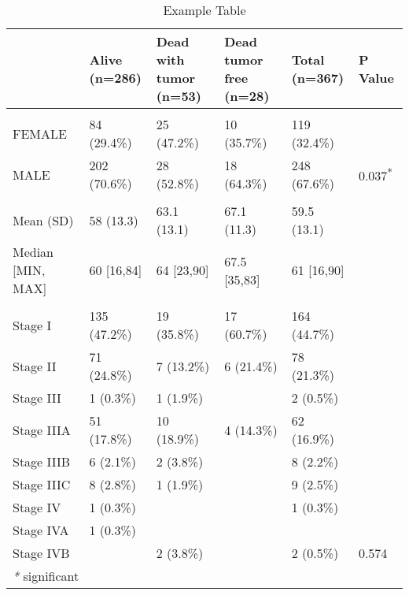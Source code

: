 \documentclass[]{article}
\begin{document}
\newpage

\begin{table}

\caption{\label{tab:unnamed-chunk-2}Example Table}
\centering
\begin{tabular}[t]{llllll}
\toprule
  & \makecell[c]{Alive\\(n=286)} & \makecell[c]{Dead with tumor\\(n=53)} & \makecell[c]{Dead tumor free\\(n=28)} & \makecell[c]{Total\\(n=367)} & P Value\\
\midrule
\addlinespace[0.3em]
\multicolumn{6}{l}{\textbf{Gender}}\\
\hspace{1em}FEMALE & 84 (29.4\%) & 25 (47.2\%) & 10 (35.7\%) & 119 (32.4\%) & \\
\hspace{1em}MALE & 202 (70.6\%) & 28 (52.8\%) & 18 (64.3\%) & 248 (67.6\%) & 0.037\textsuperscript{*}\\
\addlinespace[0.3em]
\multicolumn{6}{l}{\textbf{Age}}\\
\hspace{1em}Mean (SD) & 58 (13.3) & 63.1 (13.1) & 67.1 (11.3) & 59.5 (13.1) & \\
\hspace{1em}Median [MIN, MAX] & 60 [16,84] & 64 [23,90] & 67.5 [35,83] & 61 [16,90] & \\
\addlinespace[0.3em]
\multicolumn{6}{l}{\textbf{Stage}}\\
\hspace{1em}Stage I & 135 (47.2\%) & 19 (35.8\%) & 17 (60.7\%) & 164 (44.7\%) & \\
\hspace{1em}Stage II & 71 (24.8\%) & 7 (13.2\%) & 6 (21.4\%) & 78 (21.3\%) & \\
\hspace{1em}Stage III & 1 (0.3\%) & 1 (1.9\%) &  & 2 (0.5\%) & \\
\hspace{1em}Stage IIIA & 51 (17.8\%) & 10 (18.9\%) & 4 (14.3\%) & 62 (16.9\%) & \\
\hspace{1em}Stage IIIB & 6 (2.1\%) & 2 (3.8\%) &  & 8 (2.2\%) & \\
\hspace{1em}Stage IIIC & 8 (2.8\%) & 1 (1.9\%) &  & 9 (2.5\%) & \\
\hspace{1em}Stage IV & 1 (0.3\%) &  &  & 1 (0.3\%) & \\
\hspace{1em}Stage IVA & 1 (0.3\%) &  &  &  & \\
\hspace{1em}Stage IVB &  & 2 (3.8\%) &  & 2 (0.5\%) & 0.574\\
\bottomrule
\multicolumn{6}{l}{\textit{*} significant}\\
\end{tabular}
\end{table}
\end{document}
